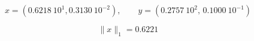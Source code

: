 \[ x=(0.6218\ 10^1, 0.3130\ 10^{-2}), \quad \quad  y=(0.2757\ 10^2, \, 0.1000\ 10^{-1}) \]

\medskip
\[ \|x\|_1= 0.6221 \]
